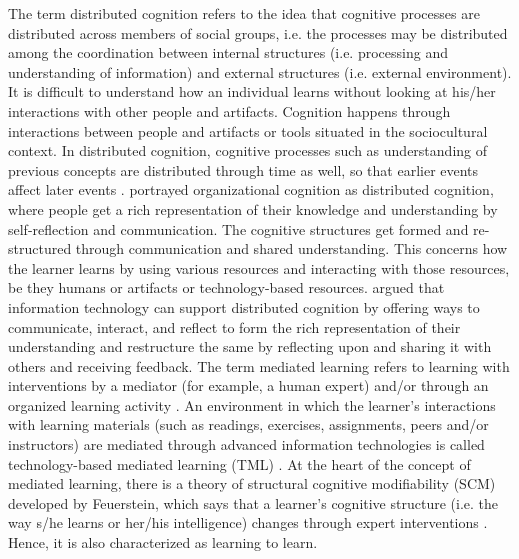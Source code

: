 \begin{multicols}{2}
The term distributed cognition refers to the idea that cognitive processes are distributed across members of social groups, i.e. the processes may be distributed among the coordination between internal structures (i.e. processing and understanding of information) and external structures (i.e. external environment). It is difficult to understand how an individual learns without looking at his/her interactions with other people and artifacts. Cognition happens through interactions between people and artifacts or tools situated in the sociocultural context. In distributed cognition, cognitive processes such as understanding of previous concepts are distributed through time as well, so that earlier events affect later events \cite{art2-key21}. \cite{art2-key45} portrayed organizational cognition as distributed cognition, where people get a rich representation of their knowledge and understanding by self-reflection and communication. The cognitive structures get formed and re-structured through communication and shared understanding. This concerns how the learner learns by using various resources and interacting with those resources, be they humans or artifacts or technology-based resources. \cite{art2-key07} argued that information technology can support distributed cognition by offering ways to communicate, interact, and reflect to form the rich representation of their understanding and restructure the same by reflecting upon and sharing it with others and receiving feedback. The term mediated learning refers to learning with interventions by a mediator (for example, a human expert) and/or through an organized learning activity \cite{art2-key16, art2-key26}. An environment in which the learner’s interactions with learning materials (such as readings, exercises, assignments, peers and/or instructors) are mediated through advanced information technologies is called technology-based mediated learning (TML) \cite{art2-key03}. At the heart of the concept of mediated learning, there is a theory of structural cognitive modifiability (SCM) developed by Feuerstein, which says that a learner’s cognitive structure (i.e. the way s/he learns or her/his intelligence) changes through expert interventions \cite{art2-key27}. Hence, it is also characterized as learning to learn.


\end{multicols}
